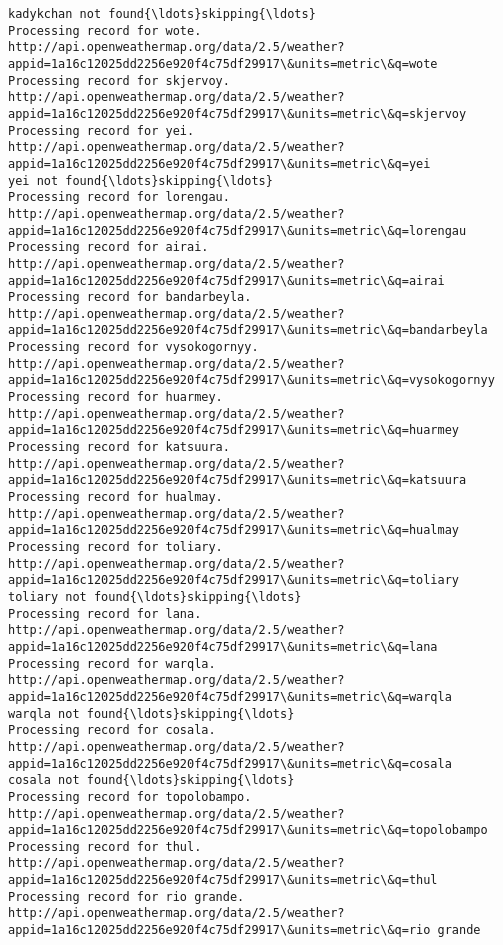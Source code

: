 \documentclass[11pt]{article}
\begin{document}
\begin{Verbatim}[commandchars=\\\{\}]
kadykchan not found{\ldots}skipping{\ldots}
Processing record for wote.
http://api.openweathermap.org/data/2.5/weather?appid=1a16c12025dd2256e920f4c75df29917\&units=metric\&q=wote
Processing record for skjervoy.
http://api.openweathermap.org/data/2.5/weather?appid=1a16c12025dd2256e920f4c75df29917\&units=metric\&q=skjervoy
Processing record for yei.
http://api.openweathermap.org/data/2.5/weather?appid=1a16c12025dd2256e920f4c75df29917\&units=metric\&q=yei
yei not found{\ldots}skipping{\ldots}
Processing record for lorengau.
http://api.openweathermap.org/data/2.5/weather?appid=1a16c12025dd2256e920f4c75df29917\&units=metric\&q=lorengau
Processing record for airai.
http://api.openweathermap.org/data/2.5/weather?appid=1a16c12025dd2256e920f4c75df29917\&units=metric\&q=airai
Processing record for bandarbeyla.
http://api.openweathermap.org/data/2.5/weather?appid=1a16c12025dd2256e920f4c75df29917\&units=metric\&q=bandarbeyla
Processing record for vysokogornyy.
http://api.openweathermap.org/data/2.5/weather?appid=1a16c12025dd2256e920f4c75df29917\&units=metric\&q=vysokogornyy
Processing record for huarmey.
http://api.openweathermap.org/data/2.5/weather?appid=1a16c12025dd2256e920f4c75df29917\&units=metric\&q=huarmey
Processing record for katsuura.
http://api.openweathermap.org/data/2.5/weather?appid=1a16c12025dd2256e920f4c75df29917\&units=metric\&q=katsuura
Processing record for hualmay.
http://api.openweathermap.org/data/2.5/weather?appid=1a16c12025dd2256e920f4c75df29917\&units=metric\&q=hualmay
Processing record for toliary.
http://api.openweathermap.org/data/2.5/weather?appid=1a16c12025dd2256e920f4c75df29917\&units=metric\&q=toliary
toliary not found{\ldots}skipping{\ldots}
Processing record for lana.
http://api.openweathermap.org/data/2.5/weather?appid=1a16c12025dd2256e920f4c75df29917\&units=metric\&q=lana
Processing record for warqla.
http://api.openweathermap.org/data/2.5/weather?appid=1a16c12025dd2256e920f4c75df29917\&units=metric\&q=warqla
warqla not found{\ldots}skipping{\ldots}
Processing record for cosala.
http://api.openweathermap.org/data/2.5/weather?appid=1a16c12025dd2256e920f4c75df29917\&units=metric\&q=cosala
cosala not found{\ldots}skipping{\ldots}
Processing record for topolobampo.
http://api.openweathermap.org/data/2.5/weather?appid=1a16c12025dd2256e920f4c75df29917\&units=metric\&q=topolobampo
Processing record for thul.
http://api.openweathermap.org/data/2.5/weather?appid=1a16c12025dd2256e920f4c75df29917\&units=metric\&q=thul
Processing record for rio grande.
http://api.openweathermap.org/data/2.5/weather?appid=1a16c12025dd2256e920f4c75df29917\&units=metric\&q=rio grande

\end{Verbatim}
\end{document}

